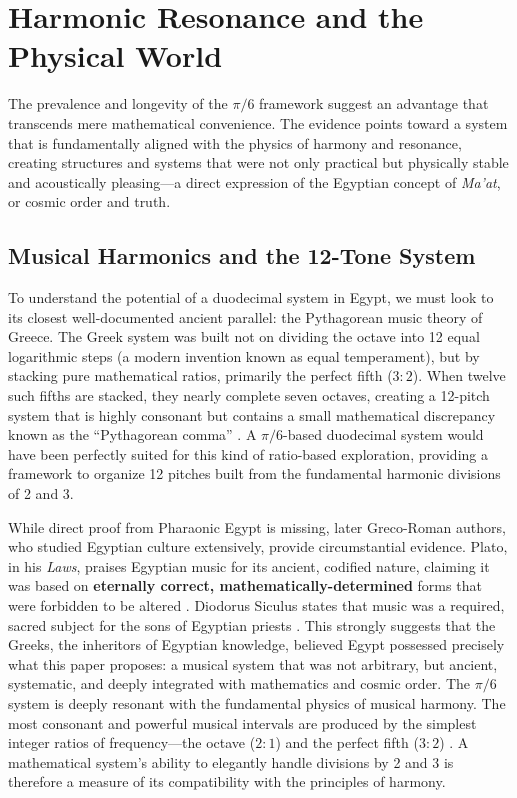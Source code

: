 \documentclass[11pt]{article}
\begin{document}
\section{Harmonic Resonance and the Physical World}
\label{sec:harmonics}

The prevalence and longevity of the $\pi/6$ framework suggest an advantage that transcends mere mathematical convenience. The evidence points toward a system that is fundamentally aligned with the physics of harmony and resonance, creating structures and systems that were not only practical but physically stable and acoustically pleasing—a direct expression of the Egyptian concept of \textit{Ma'at}, or cosmic order and truth.

\subsection{Musical Harmonics and the 12-Tone System}

To understand the potential of a duodecimal system in Egypt, we must look to its closest well-documented ancient parallel: the Pythagorean music theory of Greece. The Greek system was built not on dividing the octave into 12 equal logarithmic steps (a modern invention known as equal temperament), but by stacking pure mathematical ratios, primarily the perfect fifth ($3:2$). When twelve such fifths are stacked, they nearly complete seven octaves, creating a 12-pitch system that is highly consonant but contains a small mathematical discrepancy known as the ``Pythagorean comma'' \cite{heath1921history}. A $\pi/6$-based duodecimal system would have been perfectly suited for this kind of ratio-based exploration, providing a framework to organize 12 pitches built from the fundamental harmonic divisions of 2 and 3.

While direct proof from Pharaonic Egypt is missing, later Greco-Roman authors, who studied Egyptian culture extensively, provide circumstantial evidence. Plato, in his \textit{Laws}, praises Egyptian music for its ancient, codified nature, claiming it was based on \textbf{eternally correct, mathematically-determined} forms that were forbidden to be altered \cite[pp.~656-657]{plato_laws}. Diodorus Siculus states that music was a required, sacred subject for the sons of Egyptian priests \cite[section~1.81]{diodorus_siculus_library}. This strongly suggests that the Greeks, the inheritors of Egyptian knowledge, believed Egypt possessed precisely what this paper proposes: a musical system that was not arbitrary, but ancient, systematic, and deeply integrated with mathematics and cosmic order. The $\pi/6$ system is deeply resonant with the fundamental physics of musical harmony. The most consonant and powerful musical intervals are produced by the simplest integer ratios of frequency---the octave ($2:1$) and the perfect fifth ($3:2$) \cite{helmholtz1885sensations}. A mathematical system's ability to elegantly handle divisions by 2 and 3 is therefore a measure of its compatibility with the principles of harmony.
\end{document}
